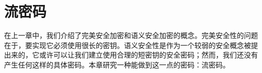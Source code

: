\chapter{流密码}\label{chap:3}

在上一章中，我们介绍了完美安全加密和语义安全加密的概念。完美安全性的问题在于，要实现它必须使用很长的密钥。语义安全性是作为一个较弱的安全概念被提出来的，它或许可以让我们建立使用合理的短密钥的安全密码；然而，我们还没有产生任何这样的具体密码。本章研究一种能做到这一点的密码：流密码。















